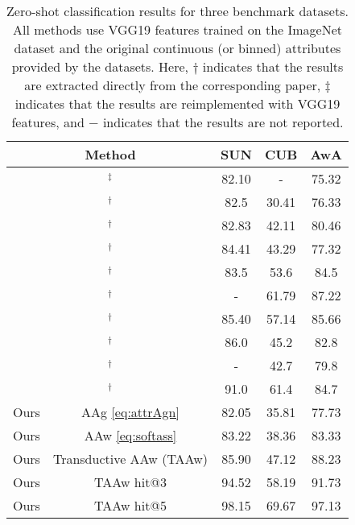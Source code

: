 \documentclass[letterpaper]{article} %
\begin{document}
\begin{table}[t!]{\small
\begin{tabular}{lc|ccc }   
\multicolumn{2}{c}{Method}    & SUN & CUB & AwA    \\
\hline
\multicolumn{2}{c|}{\cite{romera2015embarrassingly}$^\ddagger$} &  82.10 & - &  75.32 	\\
\multicolumn{2}{c|}{\cite{zhang2015zero}$^\dagger$}	& 82.5 & 30.41 & 76.33 	\\
\multicolumn{2}{c|}{\cite{zhang2016zero}$^\dagger$}      &      82.83   &   42.11  & 80.46\\
\multicolumn{2}{c|}{\cite{bucher2016improving}$^\dagger$}&84.41& 43.29 &  77.32\\
\multicolumn{2}{c|}{\cite{xu2017matrix}$^\dagger$}& 83.5 &  53.6 & 84.5   \\
\multicolumn{2}{c|}{\cite{li2017zero} $^\dagger$}		& - & 61.79 & 87.22   \\
\multicolumn{2}{c|}{\cite{yezero}$^\dagger$ }		&  85.40 &  57.14 & 85.66   \\
\multicolumn{2}{c|}{\cite{ding2017lowrank}$^\dagger$ }		&  86.0 &  45.2 & 82.8   \\
\multicolumn{2}{c|}{\cite{wang2017zero}$^\dagger$} &- & 42.7&79.8  \\
\multicolumn{2}{c|}{\cite{kodirov2017semantic}$^\dagger$} &91.0 & 61.4 &84.7\\
\hline
Ours & AAg \eqref{eq:attrAgn}              &  82.05 & 35.81 &  77.73  \\
Ours & AAw \eqref{eq:softass}             & 83.22 & 38.36 &   83.33  \\
\rowcolor{mycolor!30}
Ours & Transductive AAw (TAAw)            & 85.90 & 47.12 &   88.23  \\
\hline 
Ours &TAAw hit@3 					             &  94.52 & 58.19 &  91.73  \\
Ours &TAAw hit@5					             &  98.15 & 69.67 &  97.13  \\
\end{tabular}}
\caption{ Zero-shot classification results for three benchmark datasets. All methods use VGG19 features trained on the ImageNet dataset and the original continuous (or binned) attributes provided by the datasets. Here, $\dagger$ indicates that the results are extracted directly from the corresponding paper, $\ddagger$ indicates that the results are reimplemented with VGG19 features, and $-$ indicates that the results are not reported. }
\label{tab:table1}
\end{table}
\end{document}
